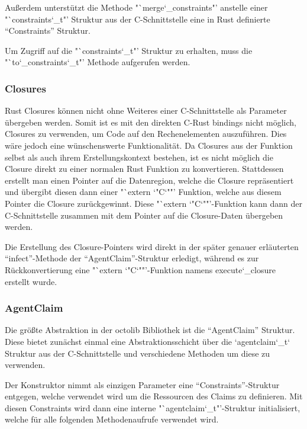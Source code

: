 Außerdem unterstützt die Methode "`merge\char`_constraints"' anstelle einer "`constraints\char`_t"' Struktur aus der
C-Schnittstelle eine in Rust definierte "`Constraints"' Struktur.

Um Zugriff auf die "`constraints\char`_t"' Struktur zu erhalten, muss die "`to\char`_constraints\char`_t"' Methode aufgerufen werden.

\subsubsection{Closures}

Rust Closures können nicht ohne Weiteres einer C-Schnittstelle als Parameter übergeben werden. Somit ist es mit den direkten
C-Rust bindings nicht möglich, Closures zu verwenden, um Code auf den Rechenelementen auszuführen. Dies wäre jedoch eine
wünschenswerte Funktionalität. Da Closures aus der Funktion selbst als auch ihrem Erstellungskontext\cite{closureWikiDe}
bestehen, ist es nicht möglich die Closure direkt zu einer normalen Rust Funktion zu konvertieren. Stattdessen erstellt
man einen Pointer auf die Datenregion, welche die Closure repräsentiert und übergibt diesen dann einer
"`extern \char`"C\char`""' Funktion, welche aus diesem Pointer die Closure zurückgewinnt.
Diese "`extern \char`"C\char`""'-Funktion kann dann der C-Schnittstelle zusammen mit dem Pointer
auf die Closure-Daten übergeben werden.

Die Erstellung des Closure-Pointers wird direkt in der später genauer erläuterten "`infect"'-Methode der "`AgentClaim"'-Struktur
erledigt, während es zur Rückkonvertierung eine "`extern \char`"C\char`""'-Funktion namens execute\char`_closure erstellt wurde.

\subsubsection{AgentClaim}

Die größte Abstraktion in der octolib Bibliothek ist die "`AgentClaim"' Struktur. Diese bietet zunächst einmal eine Abstraktionsschicht
über die `agentclaim\char`_t` Struktur aus der C-Schnittstelle und verschiedene Methoden um diese zu verwenden.

Der Konstruktor nimmt als einzigen Parameter eine "`Constraints"'-Struktur entgegen, welche verwendet wird um die
Ressourcen des Claims zu definieren. Mit diesen Constraints wird dann eine interne "`agentclaim\char`_t"'-Struktur initialisiert,
welche für alle folgenden Methodenaufrufe verwendet wird.

